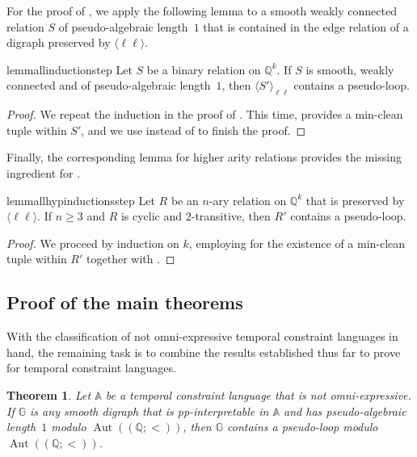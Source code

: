 \documentclass[a4paper,reqno, cleveref]{amsart}
\newtheorem{theorem}{Theorem}[section]
\newcommand{\Q}{\mathbb{Q}}
\DeclareMathOperator{\Aut}{Aut}
\newcommand{\sA}{\mathbb A}
\newcommand{\sG}{\mathbb G}
\newcommand{\gen}[1]{\langle#1\rangle}
\newcommand{\genrel}[2]{\langle{#1}\rangle_{#2}}
\begin{document}
For the proof of , we apply the following lemma to a smooth weakly connected relation $S$ of pseudo-algebraic length~$1$ that is contained in the edge relation of a digraph preserved by $\gen{\ell \ell}$. 
\begin{restatable}{lemma}{llinductionstep}\label{lemma:ll:inductionstep}
    Let  $S$ be a binary relation on $\Q^k$. If $S$ is smooth, weakly connected and of pseudo-algebraic length~$1$, then  $\genrel{S '}{\ell\ell}$ contains a pseudo-loop.
\end{restatable}
\begin{proof}
We repeat the induction in the proof of . This time,  provides a min-clean tuple within $S'$, and we use  instead of  to finish the proof. 
\end{proof}

Finally, the corresponding lemma for higher arity relations provides the missing ingredient for . 

\begin{restatable}{lemma}{llhypinductionsstep}\label{hyp:lex:inductionstep}
    Let $R$ be an $n$-ary relation on $\Q^k$ that is preserved by $\gen{\ell\ell}$. If $n \geq 3$ and $R$ is cyclic and $2$-transitive, 
    then  $R'$ contains a pseudo-loop.
    
\end{restatable}
\begin{proof}
    We proceed by induction on $k$, employing  for the existence of a min-clean tuple within $R'$ together with .
\end{proof}






\subsection{Proof of the main theorems}\label{sect:masterproof}

With the classification of not omni-expressive temporal constraint languages in hand, the remaining task is to combine the results established thus far to prove  for temporal constraint languages.

\begin{theorem}\label{temp:theorem:pseudoloop}
    Let $\sA$ be a  temporal  constraint language that is not omni-expressive. If $\sG$ is any smooth digraph that is pp-interpretable in $\sA$ and has pseudo-algebraic length~$1$ modulo $\Aut((\Q;<))$, then $\sG$ contains a pseudo-loop modulo $\Aut((\Q;<))$.
\end{theorem}
\end{document}
